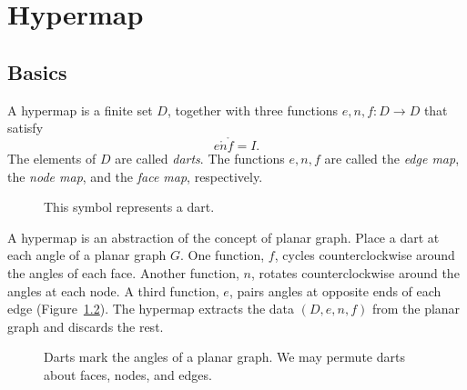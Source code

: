 

\chapter{Hypermap}\label{chap:hypermap}

\section{Basics}



\begin{definition}[hypermap]\label{def:hypermap}  A hypermap is a finite set $D$, together with
three functions $e,n,f:D\to D$ that satisfy
    $$e\ocirc n\ocirc f = I.$$
The elements of $D$ are called {\it darts}.  The functions $e,n,f$
are called the {\it edge map}, the {\it node map}, and the {\it
face map}, respectively.
\end{definition}

\begin{figure}[htb]
  \centering
  \caption{This symbol represents a dart.}
  \label{fig:dart}
\end{figure}

\begin{remark} A hypermap is an abstraction of
the concept of 
planar graph.  Place a dart at each angle of a planar graph $G$.
One function, $f$, 
cycles counterclockwise around the angles of each face.  
Another function, $n$, 
rotates counterclockwise around the angles at each
node.  A third function, $e$, pairs angles at opposite ends of
each edge  (Figure~\ref{fig:hypermap_ex}).   The hypermap extracts
the data $(D,e,n,f)$ from the planar graph and discards the rest.
\end{remark}

\begin{figure}[htb]
  \centering
  \caption{Darts mark the angles of a planar graph.  We may
  permute darts about faces, nodes, and edges.}
  \label{fig:hypermap_ex}
\end{figure}

